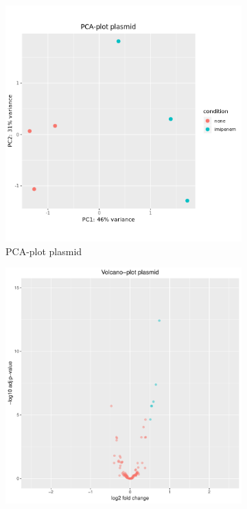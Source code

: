 \begin{figure}[ht]
    \centering
    \begin{subfigure}{0.47\textwidth}
        \includegraphics[width=0.9\linewidth]{Figures/PCA_plasmid.png}
        \caption{PCA-plot plasmid}
        \end{subfigure}
    \begin{subfigure}{0.47\textwidth}
        \includegraphics[width=0.9\linewidth]{Figures/Volcano_Plasmid.pdf}

\end{subfigure}
\end{figure}
